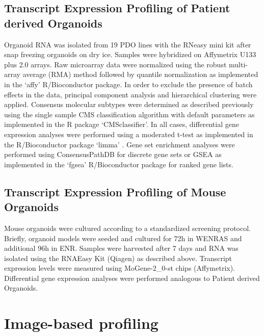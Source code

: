\begin{flushleft}
\subsection{Transcript Expression Profiling of Patient derived Organoids}
Organoid RNA was isolated from 19 PDO lines with the RNeasy mini kit after snap freezing organoids on dry ice. Samples were hybridized on Affymetrix U133 plus 2.0 arrays. Raw microarray data were normalized using the robust multi-array average (RMA) method \citep{irizarryExplorationNormalizationSummaries2003} followed by quantile normalization as implemented in the ‘affy’ \citep{gautierAffyAnalysisAffymetrix2004} R/Bioconductor \citep{huberOrchestratingHighthroughputGenomic2015} package. In order to exclude the presence of batch effects in the data, principal component analysis and hierarchical clustering were applied. Consensus molecular subtypes were determined as described previously using the single sample CMS classification algorithm with default parameters as implemented in the R package ‘CMSclassifier’. In all cases, differential gene expression analyses were performed using a moderated t-test as implemented in the R/Bioconductor package ‘limma’ \citep{ritchieLimmaPowersDifferential2015}. Gene set enrichment analyses were performed using ConsensusPathDB \citep{kamburovConsensusPathDBMoreComplete2011} for discrete gene sets or GSEA as implemented in the ‘fgsea’ R/Bioconductor package for ranked gene lists.

\subsection{Transcript Expression Profiling of Mouse Organoids}
Mouse organoids were cultured according to a standardized screening protocol. Briefly, organoid models were seeded and cultured for 72h in WENRAS and additional 96h in ENR. Samples were harvested after 7 days and RNA was isolated using the RNAEasy Kit (Qiagen) as described above. Transcript expression levels were measured using MoGene-2\_0-st chips (Affymetrix).
Differential gene expression analyses were performed analogous to Patient derived Organoids.

\section{Image-based profiling}


\end{flushleft}
